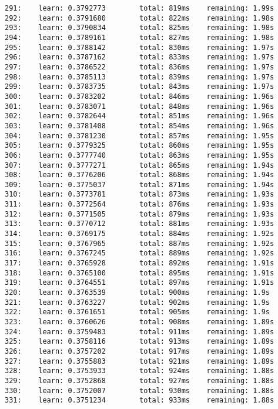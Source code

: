 \documentclass[11pt]{article}
\begin{document}
\begin{Verbatim}[commandchars=\\\{\}]
291:    learn: 0.3792773        total: 819ms    remaining: 1.99s
292:    learn: 0.3791680        total: 822ms    remaining: 1.98s
293:    learn: 0.3790834        total: 825ms    remaining: 1.98s
294:    learn: 0.3789161        total: 827ms    remaining: 1.98s
295:    learn: 0.3788142        total: 830ms    remaining: 1.97s
296:    learn: 0.3787162        total: 833ms    remaining: 1.97s
297:    learn: 0.3786522        total: 836ms    remaining: 1.97s
298:    learn: 0.3785113        total: 839ms    remaining: 1.97s
299:    learn: 0.3783735        total: 843ms    remaining: 1.97s
300:    learn: 0.3783202        total: 846ms    remaining: 1.96s
301:    learn: 0.3783071        total: 848ms    remaining: 1.96s
302:    learn: 0.3782644        total: 851ms    remaining: 1.96s
303:    learn: 0.3781408        total: 854ms    remaining: 1.96s
304:    learn: 0.3781230        total: 857ms    remaining: 1.95s
305:    learn: 0.3779325        total: 860ms    remaining: 1.95s
306:    learn: 0.3777740        total: 863ms    remaining: 1.95s
307:    learn: 0.3777271        total: 865ms    remaining: 1.94s
308:    learn: 0.3776206        total: 868ms    remaining: 1.94s
309:    learn: 0.3775037        total: 871ms    remaining: 1.94s
310:    learn: 0.3773781        total: 873ms    remaining: 1.93s
311:    learn: 0.3772564        total: 876ms    remaining: 1.93s
312:    learn: 0.3771505        total: 879ms    remaining: 1.93s
313:    learn: 0.3770712        total: 881ms    remaining: 1.93s
314:    learn: 0.3769175        total: 884ms    remaining: 1.92s
315:    learn: 0.3767965        total: 887ms    remaining: 1.92s
316:    learn: 0.3767245        total: 889ms    remaining: 1.92s
317:    learn: 0.3765928        total: 892ms    remaining: 1.91s
318:    learn: 0.3765100        total: 895ms    remaining: 1.91s
319:    learn: 0.3764551        total: 897ms    remaining: 1.91s
320:    learn: 0.3763539        total: 900ms    remaining: 1.9s
321:    learn: 0.3763227        total: 902ms    remaining: 1.9s
322:    learn: 0.3761651        total: 905ms    remaining: 1.9s
323:    learn: 0.3760626        total: 908ms    remaining: 1.89s
324:    learn: 0.3759483        total: 911ms    remaining: 1.89s
325:    learn: 0.3758116        total: 913ms    remaining: 1.89s
326:    learn: 0.3757202        total: 917ms    remaining: 1.89s
327:    learn: 0.3755883        total: 921ms    remaining: 1.89s
328:    learn: 0.3753933        total: 924ms    remaining: 1.88s
329:    learn: 0.3752868        total: 927ms    remaining: 1.88s
330:    learn: 0.3752007        total: 930ms    remaining: 1.88s
331:    learn: 0.3751234        total: 933ms    remaining: 1.88s

\end{Verbatim}
\end{document}
